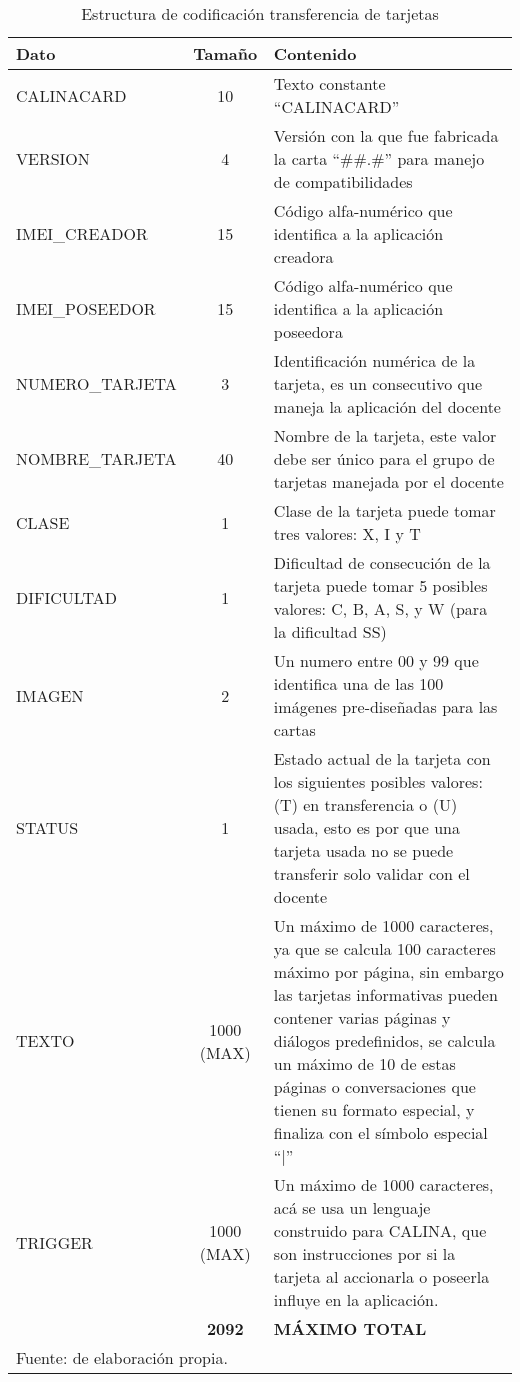 \begin{table}[!htb]
\caption{Estructura de codificación transferencia de tarjetas}
\label{tab:codificacioncarta}
\begin{center}
\footnotesize
\begin{tabular}{ p{40mm} c p{100mm}}
\toprule
\textbf{Dato} & \textbf{Tamaño} & \textbf{Contenido}\\ 
\midrule
CALINACARD & 10 & Texto constante ``CALINACARD''\\
\midrule
VERSION & 4 & Versión con la que fue fabricada la carta ``\#\#.\#'' para manejo de compatibilidades\\
\midrule
IMEI\_CREADOR & 15 & Código alfa-numérico que identifica a la aplicación creadora\\
\midrule
IMEI\_POSEEDOR & 15 & Código alfa-numérico que identifica a la aplicación poseedora\\
\midrule
NUMERO\_TARJETA & 3 & Identificación numérica de la tarjeta, es un consecutivo que maneja la aplicación del docente\\
\midrule
NOMBRE\_TARJETA & 40 & Nombre de la tarjeta, este valor debe ser único para el grupo de tarjetas manejada por el docente\\
\midrule
CLASE & 1 & Clase de la tarjeta puede tomar tres valores: X, I y T\\
\midrule
DIFICULTAD & 1 & Dificultad de consecución de la tarjeta puede tomar 5 posibles valores: C, B, A, S, y W (para la dificultad SS)\\
\midrule
IMAGEN & 2 & Un numero entre 00 y 99 que identifica una de las 100 imágenes pre-diseñadas para las cartas\\
\midrule
STATUS & 1 & Estado actual de la tarjeta con los siguientes posibles valores: (T) en transferencia o (U) 
usada, esto es por que una tarjeta usada no se puede transferir solo validar con el docente\\
\midrule
TEXTO & 1000 (MAX) &  Un máximo de 1000 caracteres, ya que se calcula 100 caracteres máximo por página, sin embargo 
las tarjetas informativas pueden contener varias páginas y diálogos predefinidos, se calcula un máximo de 10 
de estas páginas o conversaciones que tienen su formato especial, y finaliza con el símbolo especial ``|''\\
\midrule
TRIGGER & 1000 (MAX) & Un máximo de 1000 caracteres, acá se usa un lenguaje construido para CALINA, que son 
instrucciones por si la tarjeta al accionarla o poseerla influye en la aplicación.\\
\bottomrule
& \textbf{2092} & \textbf{MÁXIMO TOTAL}\\
\bottomrule
\multicolumn{3}{l}{\footnotesize Fuente: de elaboración propia.}\\
\end{tabular}
\end{center}
\end{table}


